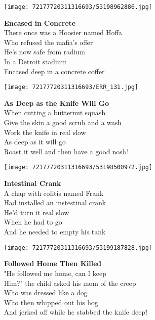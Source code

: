 \documentclass[10pt,letterpaper]{article}
\begin{document}
\begin{center}
\texttt{[image: 72177720311316693/53198962886.jpg]}
\end{center}

\begin{center}
\textbf{Encased in Concrete}\\
\vskip 0.2in
There once was a Hoosier named Hoffa\\
Who refused the mafia's offer\\
He's now safe from radium\\
In a Detroit stadium\\
Encased deep in a concrete coffer\\
\end{center}
\pagebreak

\begin{center}
\texttt{[image: 72177720311316693/ERR\_131.jpg]}
\end{center}

\begin{center}
\textbf{As Deep as the Knife Will Go}\\
\vskip 0.2in
When cutting a butternut squash\\
Give the skin a good scrub and a wash\\
Work the knife in real slow\\
As deep as it will go\\
Roast it well and then have a good nosh!\\
\end{center}
\pagebreak

\begin{center}\texttt{[image: 72177720311316693/53198500972.jpg]}
\end{center}
\begin{center}
\textbf{Intestinal Crank}\\
\vskip 0.2in
A chap with colitis named Frank\\
Had installed an instestinal crank\\
He'd turn it real slow\\
When he had to go\\
And he needed to empty his tank\\
\end{center}
\pagebreak

\begin{center}\texttt{[image: 72177720311316693/53199187828.jpg]}
\end{center}
\begin{center}
\textbf{Followed Home Then Killed}\\
\vskip 0.2in
"He followed me home, can I keep\\
Him?" the child asked his mom of the creep\\
Who was dressed like a dog\\
Who then whipped out his hog\\
And jerked off while he stabbed the knife deep!\\
\end{center}
\pagebreak
\end{document}
